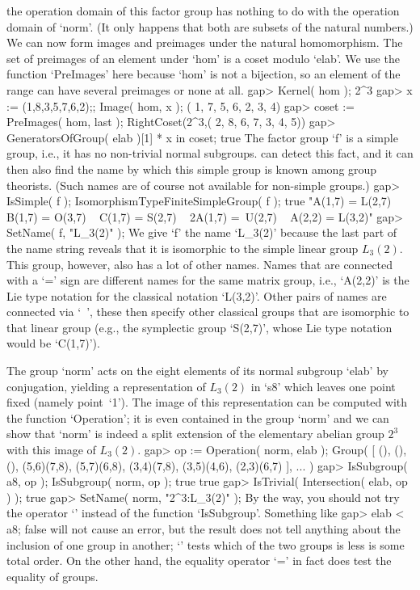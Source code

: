 the operation domain  of this factor  group has  nothing  to do with  the
operation domain of `norm'. (It only happens that both are subsets of the
natural numbers.) We can now form  images and preimages under the natural
homomorphism. The set of  preimages of an element under  `hom' is a coset
modulo `elab'. We use the function  `PreImages' here because `hom' is not
a bijection, so an  element of the range can   have several preimages  or
none at all.
\beginexample
    gap> Kernel( hom );
    2^3
    gap> x := (1,8,3,5,7,6,2);; Image( hom, x );
    ( 1, 7, 5, 6, 2, 3, 4)
    gap> coset := PreImages( hom, last );
    RightCoset(2^3,( 2, 8, 6, 7, 3, 4, 5))
    gap> GeneratorsOfGroup( elab )[1] * x in coset;
    true
\endexample
The factor  group `f'  is  a simple  group,  i.e., it has  no non-trivial
normal subgroups. {\GAP} can detect this fact,  and it can then also find
the name by which this simple group is known among group theorists. (Such
names are of course not available for non-simple groups.)
\beginexample
    gap> IsSimple( f ); IsomorphismTypeFiniteSimpleGroup( f );
    true
    "A(1,7) = L(2,7) ~ B(1,7) = O(3,7) ~ C(1,7) = S(2,7) ~ 2A(1,7) =\
    U(2,7) ~ A(2,2) = L(3,2)"
    gap> SetName( f, "L_3(2)" );
\endexample
We give `f' the name  `L_3(2)' because the  last part of the name  string
reveals that  it is isomorphic to  the simple linear group $L_3(2)$. This
group, however, also has a  lot of other  names. Names that are connected
with a  `=' sign  are different names   for the same matrix group,  i.e.,
`A(2,2)' is the  Lie type notation for  the  classical notation `L(3,2)'.
Other pairs  of  names are  connected via `~',  these then  specify other
classical  groups  that are isomorphic  to that  linear  group (e.g., the
symplectic group `S(2,7)', whose Lie type notation would be `C(1,7)').

The group `norm' acts on the eight elements of its normal subgroup `elab'
by conjugation,  yielding  a representation   of $L_3(2)$ in   `s8' which
leaves one    point  fixed  (namely  point~`1').    The   image of   this
representation can be computed with the function  `Operation'; it is even
contained  in the group `norm' and  we can show  that `norm'  is indeed a
split extension of the elementary abelian group $2^3$  with this image of
$L_3(2)$.
\beginexample
    gap> op := Operation( norm, elab );
    Group( [ (), (), (), (5,6)(7,8), (5,7)(6,8), (3,4)(7,8), (3,5)(4,6), 
      (2,3)(6,7) ], ... )
    gap> IsSubgroup( a8, op ); IsSubgroup( norm, op );
    true
    true
    gap> IsTrivial( Intersection( elab, op ) );
    true
    gap> SetName( norm, "2^3:L_3(2)" );
\endexample
By the way, you should not try the operator `\<'  instead of the function
`IsSubgroup'. Something like
\beginexample
    gap> elab < a8;
    false
\endexample
will not cause an error, but the result does not  tell anything about the
inclusion of one group in another; `\<' tests  which of the two groups is
less is some total order. On the other hand, the equality operator `=' in
fact does test the equality of groups.

